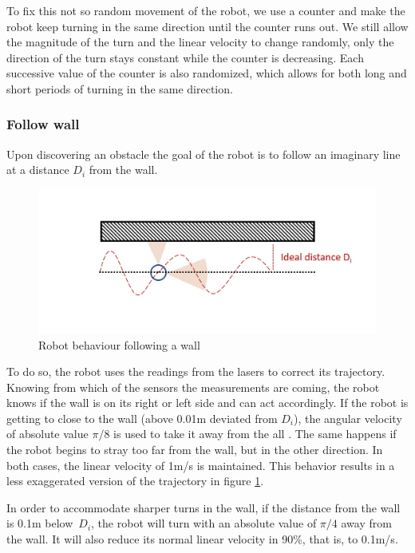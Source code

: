 \documentclass[10pt,journal,compsoc]{IEEEtran}
\begin{document}
To fix this not so random movement of the robot, we use a counter and make the robot keep turning in the same direction until the counter runs out. We still allow the magnitude of the turn and the linear velocity to change randomly, only the direction of the turn stays constant while the counter is decreasing. Each successive value of the counter is also randomized, which allows for both long and short periods of turning in the same direction.

\subsubsection{Follow wall}
Upon discovering an obstacle the goal of the robot is to follow an imaginary line at a distance $D_i$ from the wall. 

\begin{figure}[thpb]
\centering
\includegraphics[scale=0.3]{img/behaviour.jpg}
\caption{Robot behaviour following a wall}
\label{fig:wall}
\end{figure}

To do so, the robot uses the readings from the lasers to correct its trajectory. Knowing from which of the sensors the measurements are coming, the robot knows if the wall is on its right or left side and can act accordingly. If the robot is getting to close to the wall (above 0.01m deviated from $D_i$), the angular velocity of absolute value $\pi/8$ is used to take it away from the all . The same happens if the robot begins to stray too far from the wall, but in the other direction. In both cases, the linear velocity of 1m/s is maintained. This behavior results in a less exaggerated version of the trajectory in figure \ref{fig:wall}.

In order to accommodate sharper turns in the wall, if the distance from the wall is 0.1m below~$D_i$, the robot will turn with an absolute value of $\pi/4$ away from the wall. It will also reduce its normal linear velocity in 90\%, that is, to 0.1m/s.
\end{document}

